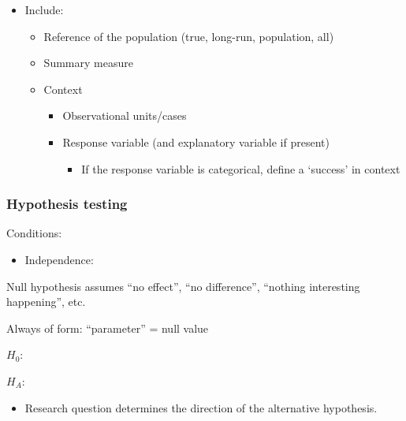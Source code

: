 \documentclass[
]{report}
\providecommand{\tightlist}{%
  \setlength{\itemsep}{0pt}\setlength{\parskip}{0pt}}
\newcommand{\rgi}{\hspace{24pt}}  %
\begin{document}
\begin{itemize}
\item
  Include:

  \begin{itemize}
  \item
    Reference of the population (true, long-run, population, all)
  \item
    Summary measure
  \item
    Context

    \begin{itemize}
    \item
      Observational units/cases
    \item
      Response variable (and explanatory variable if present)

      \begin{itemize}
      \tightlist
      \item
        If the response variable is categorical, define a `success' in context
      \end{itemize}
    \end{itemize}
  \end{itemize}
\end{itemize}

\subsubsection*{Hypothesis testing}\label{hypothesis-testing}

Conditions:

\begin{itemize}
\tightlist
\item
  Independence:
\end{itemize}

\vspace{0.3in}

Null hypothesis assumes ``no effect'', ``no difference'', ``nothing interesting happening'', etc.

\rgi Always of form: ``parameter'' = null value

\(H_0:\)

\vspace{0.5in}

\(H_A:\)

\vspace{0.5in}

\begin{itemize}
\tightlist
\item
  Research question determines the direction of the alternative hypothesis.
\end{itemize}
\end{document}
